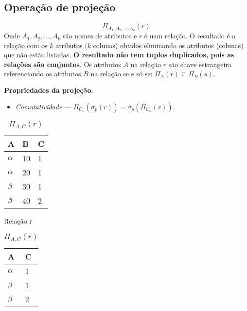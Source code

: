 \documentclass{article}
\begin{document}
\subsection{Operação de projeção}

\[
  \Pi_{A_1,A_2,\dots ,A_k}(r)
\]
Onde $A_1,A_2,\dots ,A_k$ são nomes de atributos e $r$ é uam relação. O resultado é a relação com os $k$ atributos ($k$ colunas) obtidos eliminando os atributos (colunas) que não estão listadas. \textbf{O resultado não tem tuplos duplicados, pois as relações são conjuntos}. Os atributos $A$ na relação $r$ são chave estrangeira referenciando os atributos $B$ na relação se e só se: $\Pi_A(r) \subseteq \Pi_B(s)$.
\pagebreak

\textbf{Propriedades da projeção}:
\begin{itemize}
  \item \textit{Comutatividade} --- $\Pi_{C_n}(\sigma_p(r)) = \sigma_p(\Pi_{C_n}(r))$.
\end{itemize}

\begin{table}[ht]
  \parbox{.45\linewidth}{
    \centering
    \begin{tabular}{|l|l|l|}
      \hline
      A        & B  & C \\ \hline
      $\alpha$ & 10 & 1 \\ \hline
      $\alpha$ & 20 & 1 \\ \hline
      $\beta$  & 30 & 1 \\ \hline
      $\beta$  & 40 & 2 \\ \hline
    \end{tabular}
    \caption{Relação r}
  }
  \hfill
  \parbox{.45\linewidth}{
    \centering
    \begin{tabular}{|l|l|}
      \hline
      A        & C \\ \hline
      $\alpha$ & 1 \\ \hline
      $\beta$  & 1 \\ \hline
      $\beta$  & 2 \\ \hline
    \end{tabular}
    \caption{$\Pi_{A,C}(r)$}
  }
\end{table}
\end{document}
